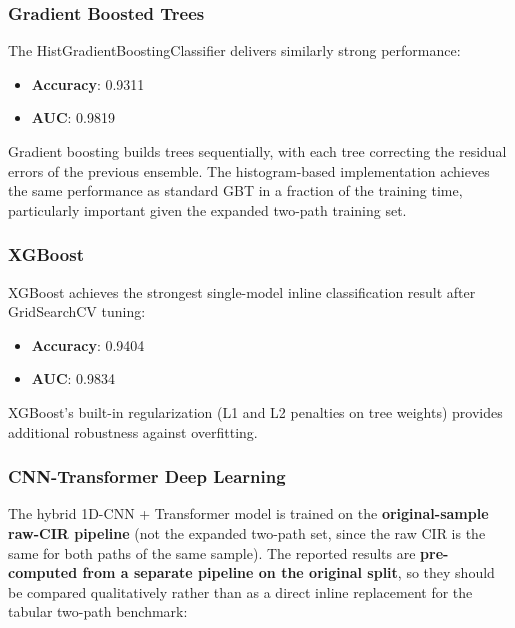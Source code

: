 \documentclass[12pt,a4paper]{article}
\providecommand{\tightlist}{%
  \setlength{\itemsep}{0pt}\setlength{\parskip}{0pt}}
\begin{document}
\subsubsection{Gradient Boosted Trees}\label{gradient-boosted-trees}

The HistGradientBoostingClassifier delivers similarly strong
performance:

\begin{itemize}
\tightlist
\item
  \textbf{Accuracy}: 0.9311
\item
  \textbf{AUC}: 0.9819
\end{itemize}

Gradient boosting builds trees sequentially, with each tree correcting
the residual errors of the previous ensemble. The histogram-based
implementation achieves the same performance as standard GBT in a
fraction of the training time, particularly important given the expanded
two-path training set.

\subsubsection{XGBoost}\label{xgboost-1}

XGBoost achieves the strongest single-model inline classification result
after GridSearchCV tuning:

\begin{itemize}
\tightlist
\item
  \textbf{Accuracy}: 0.9404
\item
  \textbf{AUC}: 0.9834
\end{itemize}

XGBoost's built-in regularization (L1 and L2 penalties on tree weights)
provides additional robustness against overfitting.

\subsubsection{CNN-Transformer Deep
Learning}\label{cnn-transformer-deep-learning}

The hybrid 1D-CNN + Transformer model is trained on the
\textbf{original-sample raw-CIR pipeline} (not the expanded two-path
set, since the raw CIR is the same for both paths of the same sample).
The reported results are \textbf{pre-computed from a separate pipeline
on the original split}, so they should be compared qualitatively rather
than as a direct inline replacement for the tabular two-path benchmark:
\end{document}
